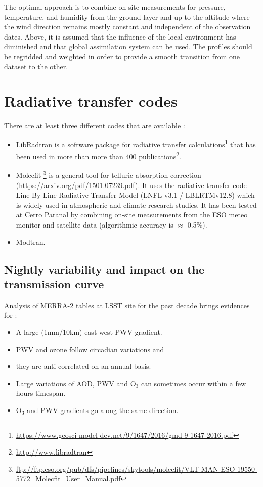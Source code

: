 \documentclass[DM,authoryear,toc,lsstdraft]{lsstdoc}
\begin{document}
The optimal approach is to combine on-site measurements for pressure, temperature,
and humidity from the ground layer and up to the altitude where the wind direction remains mostly constant and independent of the observation dates. Above, it is assumed that the influence of the local environment has diminished and that global assimilation system can be used. The profiles should be regridded and weighted in order to provide a smooth transition from one dataset to the other.



\section{Radiative transfer codes}

There are at least three different codes that are available :
\begin{itemize}
\item LibRadtran is a software package for radiative transfer calculations\footnote{\url{https://www.geosci-model-dev.net/9/1647/2016/gmd-9-1647-2016.pdf}}
that has been used in more than more than 400 publications\footnote{\url{http://www.libradtran}}.
\item Molecfit \footnote{\url{ftp://ftp.eso.org/pub/dfs/pipelines/skytools/molecfit/VLT-MAN-ESO-19550-5772_Molecfit_User_Manual.pdf}} is a general tool for telluric absorption correction (\url{https://arxiv.org/pdf/1501.07239.pdf}). It uses the radiative transfer code Line-By-Line Radiative Transfer Model (LNFL v3.1 / LBLRTMv12.8) which is widely used in atmospheric and climate research studies. It has been tested at Cerro Paranal by combining on-site measurements from the ESO meteo monitor and satellite data (algorithmic accuracy is $\approx$ 0.5\%).
\item Modtran.
\end{itemize}



\subsection{Nightly variability and impact on the transmission curve}


Analysis of MERRA-2 tables at LSST site for the past decade brings evidences for :
\begin{itemize}
\item A large (1mm/10km) east-west PWV gradient.
\item PWV and ozone follow circadian variations and
\item they are anti-correlated on an annual basis.
\item Large variations of AOD, PWV and O$_3$ can sometimes occur within a few hours timespan. 
\item O$_3$ and PWV gradients go along the same direction.
\end{itemize}
\end{document}
